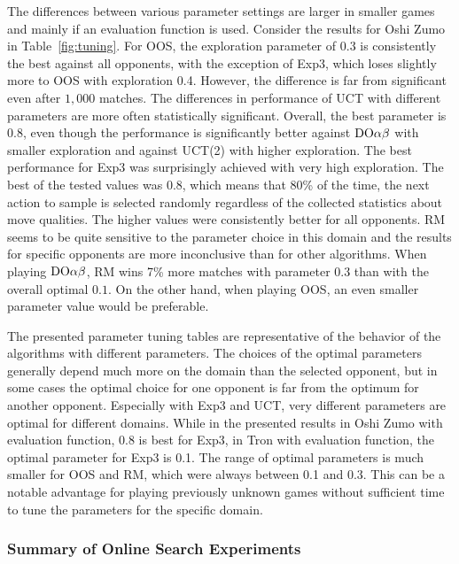 {The differences between various parameter settings are larger in smaller games and mainly if an evaluation function is used.
Consider the results for Oshi Zumo in Table~\ref{fig:tuning}.
For OOS, the exploration parameter of $0.3$ is consistently the best against all opponents, with the exception of Exp3, which loses slightly more to OOS with exploration 0.4.
However, the difference is far from significant even after $1,000$ matches.
The differences in performance of UCT with different parameters are more often statistically significant.
Overall, the best parameter is 0.8, even though the performance is significantly better against $\textrm{DO}\alpha\beta$ with smaller exploration and against UCT(2) with higher exploration.
The best performance for Exp3 was surprisingly achieved with very high exploration. The best of the tested values was 0.8, which means that 80\% of the time, the next action to sample is selected randomly regardless of the collected statistics about move qualities.
The higher values were consistently better for all opponents.
RM seems to be quite sensitive to the parameter choice in this domain and the results for specific opponents are more inconclusive than for other algorithms.
When playing $\textrm{DO}\alpha\beta$, RM wins 7\% more  matches with parameter $0.3$ than with the overall optimal $0.1$.
On the other hand, when playing OOS, an even smaller parameter value would be preferable.

The presented parameter tuning tables are representative of the behavior of the algorithms with different parameters. The choices of the optimal parameters generally depend much more on the domain than the selected opponent, but in some cases the optimal choice for one opponent is far from the optimum for another opponent.  Especially with Exp3 and UCT, very different parameters are optimal for different domains.
While in the presented results in Oshi Zumo with evaluation function, 0.8 is best for Exp3, in Tron with evaluation function, the optimal parameter for Exp3 is 0.1.
The range of optimal parameters is much smaller for OOS and RM, which were always between 0.1 and 0.3. This can be a notable advantage for playing previously unknown games without sufficient time to tune the parameters for the specific domain.
}

\subsubsection{Summary of Online Search Experiments}

